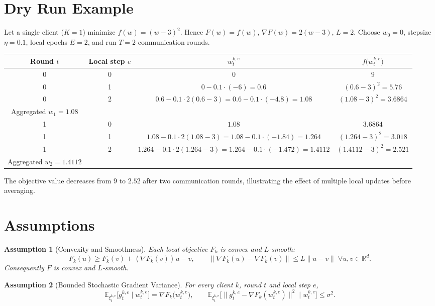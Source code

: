 \documentclass[11pt]{article}
\newtheorem{assumption}{Assumption}
\newcommand{\E}{\mathbb{E}}
\newcommand{\R}{\mathbb{R}}
\newcommand{\inner}[1]{\left\langle #1\right\rangle}
\begin{document}
\section*{Dry Run Example}
Let a single client ($K=1$) minimize $f(w)=(w-3)^2$.  
Hence $F(w)=f(w)$, $\nabla F(w)=2(w-3)$, $L=2$.  
Choose $w_0=0$, stepsize $\eta=0.1$, local epochs $E=2$, and run $T=2$ communication rounds.

\begin{center}
\begin{tabular}{c|c|c|c}
Round $t$ & Local step $e$ & $w_{t}^{k,e}$ & $f\big(w_{t}^{k,e}\big)$\\ \hline
0 & 0 & $0$ & $9$\\
0 & 1 & $0-0.1\cdot(-6)=0.6$ & $(0.6-3)^2=5.76$\\
0 & 2 & $0.6-0.1\cdot2(0.6-3)=0.6-0.1\cdot(-4.8)=1.08$ & $(1.08-3)^2=3.6864$\\ \hline
Aggregated $w_1=1.08$ & & & \\
\hline
1 & 0 & $1.08$ & $3.6864$\\
1 & 1 & $1.08-0.1\cdot2(1.08-3)=1.08-0.1\cdot(-1.84)=1.264$ & $(1.264-3)^2=3.018$\\
1 & 2 & $1.264-0.1\cdot2(1.264-3)=1.264-0.1\cdot(-1.472)=1.4112$ & $(1.4112-3)^2=2.521$\\ \hline
Aggregated $w_2=1.4112$ & & &
\end{tabular}
\end{center}
The objective value decreases from $9$ to $2.52$ after two communication rounds, illustrating the effect of multiple local updates before averaging.

\newpage

\section*{Assumptions}
\begin{assumption}[Convexity and Smoothness]\label{ass:convex_smooth}
Each local objective $F_k$ is convex and $L$‑smooth:
\[
F_k(u)\ge F_k(v)+\inner{\nabla F_k(v)}{u-v},
\qquad
\|\nabla F_k(u)-\nabla F_k(v)\|\le L\|u-v\|\;\forall u,v\in\R^d.
\]
Consequently $F$ is convex and $L$‑smooth.
\end{assumption}

\begin{assumption}[Bounded Stochastic Gradient Variance]\label{ass:variance}
For every client $k$, round $t$ and local step $e$,
\[
\E_{\xi_{t}^{k,e}}\!\big[g_{t}^{k,e}\mid w_{t}^{k,e}\big]=\nabla F_k\!\big(w_{t}^{k,e}\big),
\qquad
\E_{\xi_{t}^{k,e}}\!\big[\|g_{t}^{k,e}-\nabla F_k(w_{t}^{k,e})\|^2\mid w_{t}^{k,e}\big]\le\sigma^2 .
\]
\end{assumption}
\end{document}
